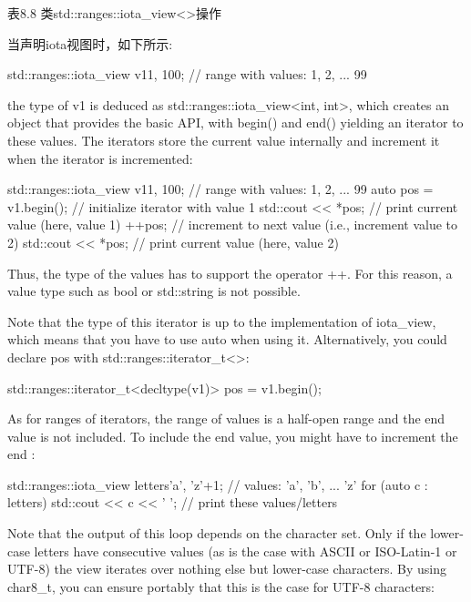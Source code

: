 \begin{center}
表8.8 类std::ranges::iota\_view<>操作
\end{center}

当声明iota视图时，如下所示:

\begin{cpp}
std::ranges::iota_view v1{1, 100}; // range with values: 1, 2, ... 99
\end{cpp}

the type of v1 is deduced as std::ranges::iota\_view<int, int>, which creates an object that provides the basic API, with begin() and end() yielding an iterator to these values. The iterators store the current value internally and increment it when the iterator is incremented:

\begin{cpp}
std::ranges::iota_view v1{1, 100}; // range with values: 1, 2, ... 99
auto pos = v1.begin(); // initialize iterator with value 1
std::cout << *pos; // print current value (here, value 1)
++pos; // increment to next value (i.e., increment value to 2)
std::cout << *pos; // print current value (here, value 2)
\end{cpp}

Thus, the type of the values has to support the operator ++. For this reason, a value type such as bool or std::string is not possible.

Note that the type of this iterator is up to the implementation of iota\_view, which means that you have to use auto when using it. Alternatively, you could declare pos with std::ranges::iterator\_t<>:

\begin{cpp}
std::ranges::iterator_t<decltype(v1)> pos = v1.begin();
\end{cpp}

As for ranges of iterators, the range of values is a half-open range and the end value is not included. To include the end value, you might have to increment the end :

\begin{cpp}
std::ranges::iota_view letters{'a', 'z'+1}; // values: ’a’, ’b’, ... ’z’
for (auto c : letters) {
	std::cout << c << ' '; // print these values/letters
}
\end{cpp}

Note that the output of this loop depends on the character set. Only if the lower-case letters have consecutive values (as is the case with ASCII or ISO-Latin-1 or UTF-8) the view iterates over nothing else but lower-case characters. By using char8\_t, you can ensure portably that this is the case for UTF-8 characters:

